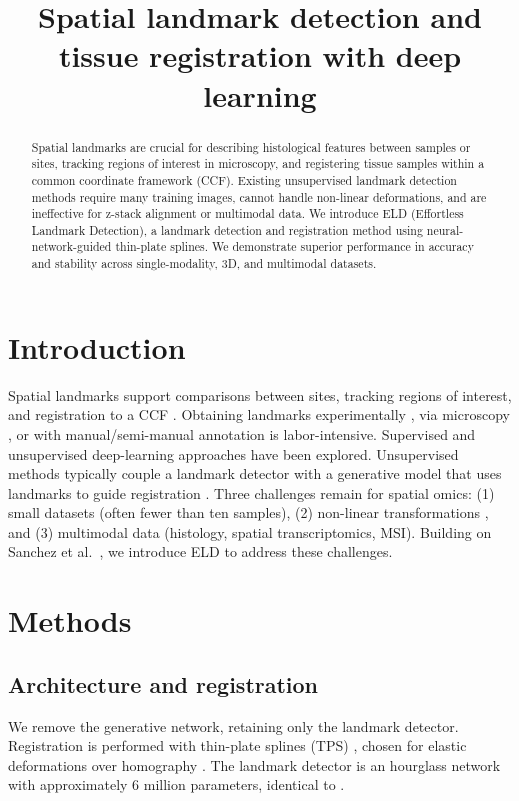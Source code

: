 \documentclass[11pt]{article}
\title{Spatial landmark detection and tissue registration with deep learning}
\author{}
\date{}
\begin{document}
\maketitle

\begin{abstract}
Spatial landmarks are crucial for describing histological features between samples or sites, tracking regions of interest in microscopy, and registering tissue samples within a common coordinate framework (CCF). Existing unsupervised landmark detection methods require many training images, cannot handle non-linear deformations, and are ineffective for z-stack alignment or multimodal data. We introduce ELD (Effortless Landmark Detection), a landmark detection and registration method using neural-network-guided thin-plate splines. We demonstrate superior performance in accuracy and stability across single-modality, 3D, and multimodal datasets.
\end{abstract}

\section{Introduction}
Spatial landmarks support comparisons between sites, tracking regions of interest, and registration to a CCF \citep{r1,r2,r3}. Obtaining landmarks experimentally \citep{r4}, via microscopy \citep{r2}, or with manual/semi-manual annotation \citep{r5} is labor-intensive. Supervised \citep{r6,r7} and unsupervised \citep{r8,r9} deep-learning approaches have been explored. Unsupervised methods typically couple a landmark detector with a generative model that uses landmarks to guide registration \citep{r10}. Three challenges remain for spatial omics: (1) small datasets (often fewer than ten samples), (2) non-linear transformations \citep{r11}, and (3) multimodal data (histology, spatial transcriptomics, MSI). Building on Sanchez et al.\ \citep{r8}, we introduce ELD to address these challenges.

\section{Methods}
\subsection{Architecture and registration}
We remove the generative network, retaining only the landmark detector. Registration is performed with thin-plate splines (TPS) \citep{r12}, chosen for elastic deformations over homography \citep{r11}. The landmark detector is an hourglass network with approximately 6 million parameters, identical to \citep{r8}.
\end{document}
